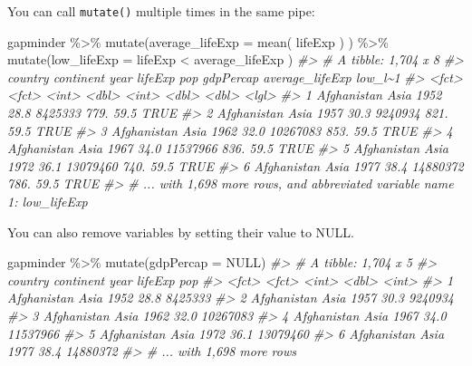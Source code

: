 \documentclass[
]{book}
\newenvironment{Shaded}{\begin{snugshade}}{\end{snugshade}}
\newcommand{\AttributeTok}[1]{\textcolor[rgb]{0.77,0.63,0.00}{#1}}
\newcommand{\CommentTok}[1]{\textcolor[rgb]{0.56,0.35,0.01}{\textit{#1}}}
\newcommand{\ConstantTok}[1]{\textcolor[rgb]{0.00,0.00,0.00}{#1}}
\newcommand{\FunctionTok}[1]{\textcolor[rgb]{0.00,0.00,0.00}{#1}}
\newcommand{\NormalTok}[1]{#1}
\newcommand{\SpecialCharTok}[1]{\textcolor[rgb]{0.00,0.00,0.00}{#1}}
\begin{document}
You can call \texttt{mutate()} multiple times in the same pipe:

\begin{Shaded}
\begin{Highlighting}[]
\NormalTok{gapminder }\SpecialCharTok{\%\textgreater{}\%} 
  \FunctionTok{mutate}\NormalTok{(}\AttributeTok{average\_lifeExp =} \FunctionTok{mean}\NormalTok{( lifeExp ) ) }\SpecialCharTok{\%\textgreater{}\%}
   \FunctionTok{mutate}\NormalTok{(}\AttributeTok{low\_lifeExp =}\NormalTok{ lifeExp }\SpecialCharTok{\textless{}}\NormalTok{ average\_lifeExp )}
\CommentTok{\#\textgreater{} \# A tibble: 1,704 x 8}
\CommentTok{\#\textgreater{}   country     continent  year lifeExp      pop gdpPercap average\_lifeExp low\_l\textasciitilde{}1}
\CommentTok{\#\textgreater{}   \textless{}fct\textgreater{}       \textless{}fct\textgreater{}     \textless{}int\textgreater{}   \textless{}dbl\textgreater{}    \textless{}int\textgreater{}     \textless{}dbl\textgreater{}           \textless{}dbl\textgreater{} \textless{}lgl\textgreater{}  }
\CommentTok{\#\textgreater{} 1 Afghanistan Asia       1952    28.8  8425333      779.            59.5 TRUE   }
\CommentTok{\#\textgreater{} 2 Afghanistan Asia       1957    30.3  9240934      821.            59.5 TRUE   }
\CommentTok{\#\textgreater{} 3 Afghanistan Asia       1962    32.0 10267083      853.            59.5 TRUE   }
\CommentTok{\#\textgreater{} 4 Afghanistan Asia       1967    34.0 11537966      836.            59.5 TRUE   }
\CommentTok{\#\textgreater{} 5 Afghanistan Asia       1972    36.1 13079460      740.            59.5 TRUE   }
\CommentTok{\#\textgreater{} 6 Afghanistan Asia       1977    38.4 14880372      786.            59.5 TRUE   }
\CommentTok{\#\textgreater{} \# ... with 1,698 more rows, and abbreviated variable name 1: low\_lifeExp}
\end{Highlighting}
\end{Shaded}

You can also remove variables by setting their value to NULL.

\begin{Shaded}
\begin{Highlighting}[]
\NormalTok{gapminder }\SpecialCharTok{\%\textgreater{}\%} \FunctionTok{mutate}\NormalTok{(}\AttributeTok{gdpPercap =} \ConstantTok{NULL}\NormalTok{)}
\CommentTok{\#\textgreater{} \# A tibble: 1,704 x 5}
\CommentTok{\#\textgreater{}   country     continent  year lifeExp      pop}
\CommentTok{\#\textgreater{}   \textless{}fct\textgreater{}       \textless{}fct\textgreater{}     \textless{}int\textgreater{}   \textless{}dbl\textgreater{}    \textless{}int\textgreater{}}
\CommentTok{\#\textgreater{} 1 Afghanistan Asia       1952    28.8  8425333}
\CommentTok{\#\textgreater{} 2 Afghanistan Asia       1957    30.3  9240934}
\CommentTok{\#\textgreater{} 3 Afghanistan Asia       1962    32.0 10267083}
\CommentTok{\#\textgreater{} 4 Afghanistan Asia       1967    34.0 11537966}
\CommentTok{\#\textgreater{} 5 Afghanistan Asia       1972    36.1 13079460}
\CommentTok{\#\textgreater{} 6 Afghanistan Asia       1977    38.4 14880372}
\CommentTok{\#\textgreater{} \# ... with 1,698 more rows}
\end{Highlighting}
\end{Shaded}
\end{document}
